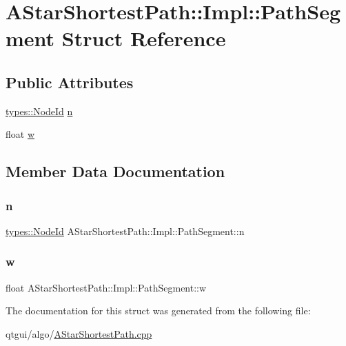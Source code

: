 \hypertarget{struct_a_star_shortest_path_1_1_impl_1_1_path_segment}{}\section{A\+Star\+Shortest\+Path\+::Impl\+::Path\+Segment Struct Reference}
\label{struct_a_star_shortest_path_1_1_impl_1_1_path_segment}
\subsection*{Public Attributes}
\begin{DoxyCompactItemize}
\item 
\mbox{\hyperlink{classtypes_1_1_node_id}{types\+::\+Node\+Id}} \mbox{\hyperlink{struct_a_star_shortest_path_1_1_impl_1_1_path_segment_a9ef81e1db836698afb577ea125b1250e}{n}}
\item 
float \mbox{\hyperlink{struct_a_star_shortest_path_1_1_impl_1_1_path_segment_a268f6efb117b248d10e43370a78fd876}{w}}
\end{DoxyCompactItemize}


\subsection{Member Data Documentation}
\mbox{\label{struct_a_star_shortest_path_1_1_impl_1_1_path_segment_a9ef81e1db836698afb577ea125b1250e}} 
\subsubsection{\texorpdfstring{n}{n}}
{\footnotesize\ttfamily \mbox{\hyperlink{classtypes_1_1_node_id}{types\+::\+Node\+Id}} A\+Star\+Shortest\+Path\+::\+Impl\+::\+Path\+Segment\+::n}

\mbox{\label{struct_a_star_shortest_path_1_1_impl_1_1_path_segment_a268f6efb117b248d10e43370a78fd876}} 
\subsubsection{\texorpdfstring{w}{w}}
{\footnotesize\ttfamily float A\+Star\+Shortest\+Path\+::\+Impl\+::\+Path\+Segment\+::w}



The documentation for this struct was generated from the following file\+:\begin{DoxyCompactItemize}
\item 
qtgui/algo/\mbox{\hyperlink{_a_star_shortest_path_8cpp}{A\+Star\+Shortest\+Path.\+cpp}}\end{DoxyCompactItemize}
